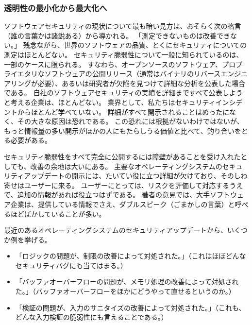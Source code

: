 \documentclass[uplatex]{jsarticle}
\def\label#1{}%
\begin{document}
\subsubsection{透明性の最小化から最大化へ}

ソフトウェアセキュリティの現状について最も暗い見方は、おそらく次の格言（誰の言葉かは諸説ある）から導かれる。
「測定できないものは改善できない。」
残念ながら、世界のソフトウェアの品質、とくにセキュリティについての測定はほとんどない。
セキュリティ脆弱性について一般に知られているのは、一部のケースに限られる。
すなわち、オープンソースのソフトウェア、プロプライエタリなソフトウェアの公開リリース（通常はバイナリのリバースエンジニアリングが必要）、あるいは研究者が欠陥を見つけて詳細な分析を公表した場合である。
自社のソフトウェアセキュリティの実績を詳細まですべて公表しようと考える企業は、ほとんどない。
業界として、私たちはセキュリティインシデントからほとんど学べていない。
詳細がすべて開示されることはめったになく、その大きな原因は恐れである。
この恐れには根拠がないわけではないが、もっと情報量の多い開示がほかの人にもたらしうる価値と比べて、釣り合いをとる必要がある。

セキュリティ脆弱性をすべて完全に公開するには障壁があることを受け入れたとしても、改善の余地は大いにある。
主要なオペレーティングシステムのセキュリティアップデートの開示には、たいてい役に立つ詳細が欠けており、そのしわ寄せはユーザーに来る。
ユーザーにとっては、リスクを評価して対応するうえで、追加の情報があれば役立つはずである。
著者の意見では、大手ソフトウェア企業は、提供している情報でさえ、ダブルスピーク（ごまかしの言葉）と呼べるほどぼかしていることが多い。

\begin{exa}\label{exa:ch14-vague-release-notes}
最近のあるオペレーティングシステムのセキュリティアップデートから、いくつか例を挙げる。
\begin{itemize}
\item 「ロジックの問題が、制限の改善によって対処された。」（これはほぼどんなセキュリティバグにも当てはまる。）
\item 「バッファオーバーフローの問題が、メモリ処理の改善によって対処された。」（バッファオーバーフローをほかにどうやって直せるというのか。）
\item 「検証の問題が、入力のサニタイズの改善によって対処された。」（これも、どんな入力検証の脆弱性にも言えることである。）
\end{itemize}
\end{exa}
\end{document}

